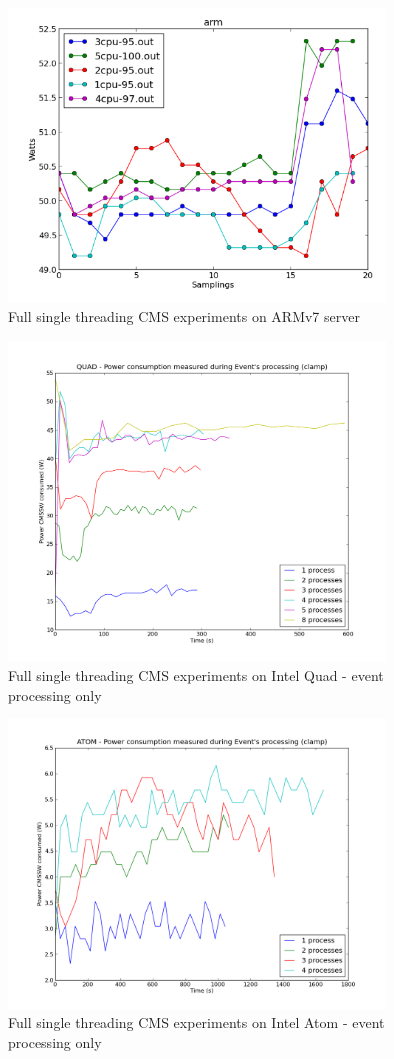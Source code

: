 \begin{figure}[h!]
  \centering
    \includegraphics[width=100mm]{"img/aalto/aalto_total_arm"}
    \caption{Full single threading CMS experiments on ARMv7 server}
    \label{fig:aalto_arm_clamp}
\end{figure}

\begin{figure}[h!]
  \centering
    \includegraphics[width=100mm]{"img/aalto/aalto_quadEvents"}
    \caption{Full single threading CMS experiments on Intel Quad - event
    \label{fig:aalto_quad_events}
processing only}
\end{figure}

\begin{figure}[h!]
  \centering
    \includegraphics[width=100mm]{"img/aalto/aalto_atomEvents"}
    \caption{Full single threading CMS experiments on Intel Atom - event
    \label{fig:aalto_atom_events}
processing only}
\end{figure}


